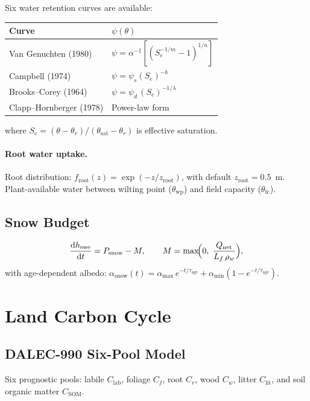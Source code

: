 \documentclass[11pt,twoside]{report}
\newcommand{\dd}{\mathrm{d}}
\newcommand{\Lf}{L_f}
\begin{document}
Six water retention curves are available:
\begin{center}
\begin{tabular}{ll}
\toprule
Curve & $\psi(\theta)$ \\
\midrule
Van Genuchten (1980) & $\psi = \alpha^{-1}[(S_e^{-1/m}-1)^{1/n}]$ \\
Campbell (1974) & $\psi = \psi_s(S_e)^{-b}$ \\
Brooks--Corey (1964) & $\psi = \psi_d\,(S_e)^{-1/\lambda}$ \\
Clapp--Hornberger (1978) & Power-law form \\
\bottomrule
\end{tabular}
\end{center}
where $S_e = (\theta-\theta_r)/(\theta_{\mathrm{sat}}-\theta_r)$ is
effective saturation.

\paragraph{Root water uptake.}
Root distribution: $f_{\mathrm{root}}(z)=\exp(-z/z_{\mathrm{root}})$,
with default $z_{\mathrm{root}}=0.5$~m.
Plant-available water between wilting point ($\theta_{\mathrm{wp}}$)
and field capacity ($\theta_{\mathrm{fc}}$).

\subsection{Snow Budget}
\begin{equation}
  \frac{\dd h_{\mathrm{swe}}}{\dd t} = P_{\mathrm{snow}} - M,
  \qquad M = \max\!\Bigl(0,\;\frac{Q_{\mathrm{net}}}{\Lf\,\rho_w}\Bigr),
\end{equation}
with age-dependent albedo: $\alpha_{\mathrm{snow}}(t)=\alpha_{\max}\,e^{-t/\tau_{\mathrm{age}}}
+ \alpha_{\min}(1-e^{-t/\tau_{\mathrm{age}}})$.


\section{Land Carbon Cycle}
\label{sec:carbon}

\subsection{DALEC-990 Six-Pool Model}

Six prognostic pools: labile $C_{\mathrm{lab}}$, foliage $C_f$,
root $C_r$, wood $C_w$, litter $C_{\mathrm{lit}}$, and
soil organic matter $C_{\mathrm{SOM}}$.
\end{document}
